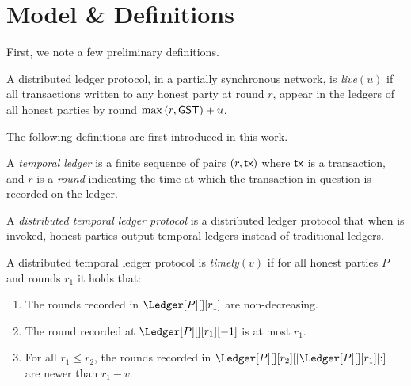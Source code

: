 \section{Model \& Definitions}


First, we note a few preliminary definitions.




\begin{definition}
  A distributed ledger protocol, in a partially synchronous network,
  is \emph{live}$(u)$ if all transactions written to any honest party
  at round $r$, appear in the ledgers of all honest parties by round %
  $\max{(r,\textsf{GST})} + u$.
\end{definition}


The following definitions are first introduced in this work.

\begin{definition}
  A \emph{temporal ledger} is a finite sequence of pairs $(r, \textsf{tx})$ where $\textsf{tx}$ is
  a transaction, and $r$ is a \emph{round} indicating the time at which
  the transaction in question is recorded on the ledger.
\end{definition}

\begin{definition}
  A \emph{distributed temporal ledger protocol} is a distributed ledger protocol
  that when \rread is invoked, honest parties output temporal ledgers instead of traditional ledgers.
\end{definition}

\begin{definition}[Timely]\label{def:timely}
  A distributed temporal ledger protocol is \emph{timely}$(v)$
  if for all honest parties $P$ and rounds $r_1$ it holds that:

  \begin{enumerate}
    \item The rounds recorded in $\Ledger[P][][r_1]$ are non-decreasing.\label{def:timely-increasing}
    \item The round recorded at $\Ledger[P][][r_1][-1]$ is at most $r_1$.\label{def:timely-past}
    \item For all $r_1 \leq r_2$, the rounds recorded in $\Ledger[P][][r_2][|\Ledger[P][][r_1]|{:}]$ are
          newer than $r_1 - v$.\label{def:timely-chunk}
  \end{enumerate}
\end{definition}

